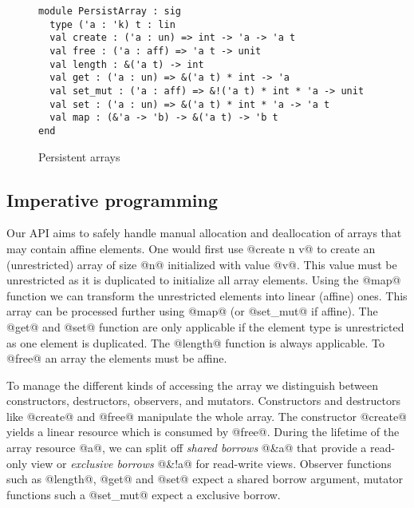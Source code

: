 \begin{figure}[tp]
  \centering
\begin{lstlisting}
module PersistArray : sig
  type ('a : 'k) t : lin
  val create : ('a : un) => int -> 'a -> 'a t
  val free : ('a : aff) => 'a t -> unit
  val length : &('a t) -> int
  val get : ('a : un) => &('a t) * int -> 'a
  val set_mut : ('a : aff) => &!('a t) * int * 'a -> unit
  val set : ('a : un) => &('a t) * int * 'a -> 'a t
  val map : (&'a -> 'b) -> &('a t) -> 'b t
end
\end{lstlisting}
  \vspace{-15pt}
  \caption{Persistent arrays}
  \label{sig:array}
  \label{sig:hybarray}
  \label{ex:cow}
\end{figure}

\subsection{Imperative programming}

Our API
aims to safely handle manual allocation and
deallocation of arrays that may contain affine elements.
One would first use @create n v@ to create
an (unrestricted) array of size @n@ initialized with value
@v@. This value must be unrestricted as it is duplicated to
initialize all array elements. Using the @map@ function we
can transform the unrestricted elements into linear (affine)
ones. This array can be processed further using @map@ (or @set_mut@ if
affine). The @get@ and @set@ function are only applicable if the element type
is unrestricted as one element is duplicated. The @length@
function is always applicable. To @free@ an array the elements must be
affine.

To manage the different kinds of accessing the array we distinguish between constructors, destructors,
observers, and mutators.
Constructors and destructors like @create@ and @free@ manipulate the whole
array. %
The constructor
@create@ yields a linear resource which is consumed by @free@.
During the lifetime of the array resource @a@, we can split
off \emph{shared borrows} @&a@ that provide a read-only
view or \emph{exclusive borrows} @&!a@ for read-write views.
Observer functions such as @length@, @get@ and @set@ expect a shared borrow
argument, mutator functions such a @set_mut@ expect
a exclusive borrow.

